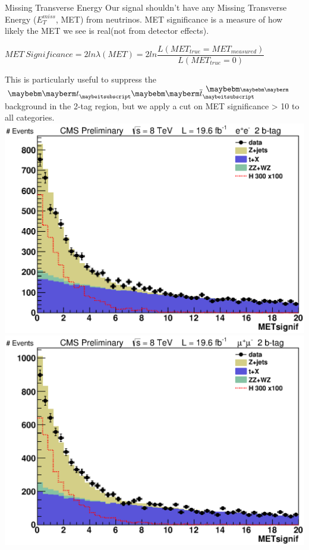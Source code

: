 \begin{frame}{Missing Transverse Energy}
\footnotesize
Our signal shouldn't have any Missing Transverse Energy ($E_T^{miss}$, MET) from neutrinos.
MET significance is a measure of how likely the MET we see is real(not from detector effects).\\
\begin{block}{}
\begin{center}
$MET\ Significance = 2ln\lambda(MET) = 2ln \dfrac{L(MET_{true} = MET_{measured})}{L(MET_{true} = 0)}$
\end{center}
\end{block}

This is particularly useful to suppress the $\Pqt \Paqt$ background in the 2-tag region, but we apply a cut on MET significance > 10 to all categories.  
\\
\includegraphics[width=0.5\linewidth]{images/preselection/2/el/METsignif.eps}
\includegraphics[width=0.5\linewidth]{images/preselection/2/mu/METsignif.eps}
\end{frame}

















